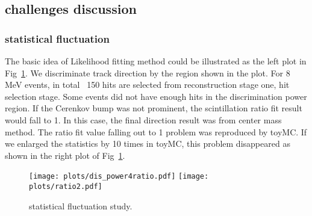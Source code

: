 \documentclass[a4paper,10pt]{cpc-hepnp}
\begin{document}
\subsection{challenges discussion}
\subsubsection{statistical fluctuation}
The basic idea of Likelihood fitting method could be illustrated as the left plot
in Fig~\ref{dis_power}. We discriminate track direction by the region shown in
the plot. For 8 MeV events, in total ~150 hits are selected from reconstruction
stage one, hit selection stage. Some events did not have enough hits in the discrimination power
region. If the Cerenkov bump was not prominent, the scintillation ratio fit
result would fall to 1. In this case, the final direction result was from center mass
method. The ratio fit value falling out to 1 problem  was reproduced by toyMC. If we
enlarged the statistics by 10 times in toyMC, this problem disappeared as shown
in the right plot of Fig~\ref{dis_power}.
\begin{figure}[htbp]
\centering %
\texttt{[image: plots/dis\_power4ratio.pdf]}
\texttt{[image: plots/ratio2.pdf]}
\caption{\label{dis_power} statistical fluctuation study.}
\end{figure}
\end{document}
